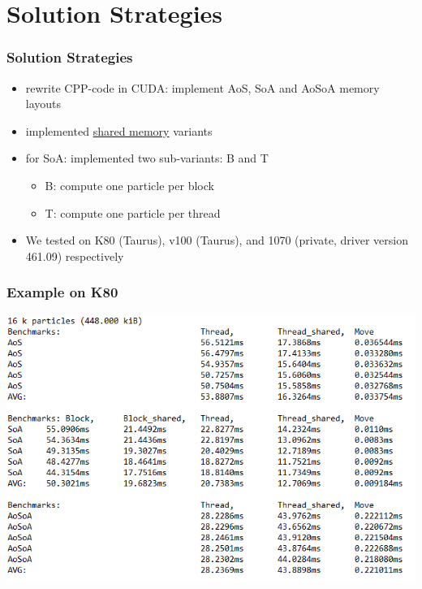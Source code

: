 \documentclass[aspectratio=169]{beamer}
\begin{document}
\section{Solution Strategies}
\begin{frame}
	\frametitle{Solution Strategies}
	\begin{itemize}
		\item rewrite CPP-code in CUDA: implement AoS, SoA and AoSoA memory layouts
		\item implemented \underline{shared memory} variants
		\item for SoA: implemented two sub-variants: B and T
			\begin{itemize}
				\item B: compute one particle per block
				\item T: compute one particle per thread
			\end{itemize}
		\item We tested on K80 (Taurus), v100 (Taurus), and 1070 (private, driver version 461.09) respectively
	\end{itemize}
\end{frame}

\begin{frame}
	\frametitle{Example on K80}
	\includegraphics[scale=0.5]{resources/data-example.png}
\end{frame}
\end{document}
